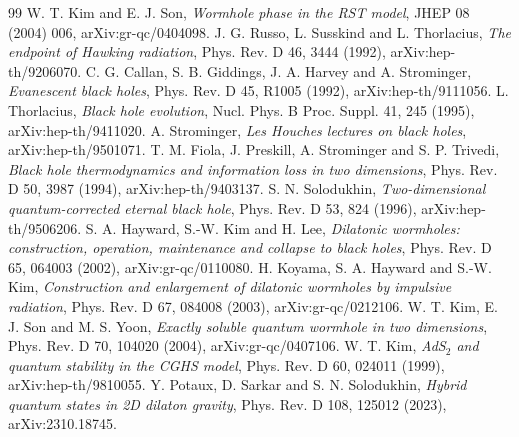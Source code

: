 \documentclass[11pt]{article}
\theoremstyle{remark}
\begin{document}
\begin{thebibliography}{99}
 W. T. Kim and E. J. Son, \emph{Wormhole phase in the RST model}, JHEP 08 (2004) 006, arXiv:gr-qc/0404098.
 J. G. Russo, L. Susskind and L. Thorlacius, \emph{The endpoint of Hawking radiation}, Phys. Rev. D 46, 3444 (1992), arXiv:hep-th/9206070.
 C. G. Callan, S. B. Giddings, J. A. Harvey and A. Strominger, \emph{Evanescent black holes}, Phys. Rev. D 45, R1005 (1992), arXiv:hep-th/9111056.
 L. Thorlacius, \emph{Black hole evolution}, Nucl. Phys. B Proc. Suppl. 41, 245 (1995), arXiv:hep-th/9411020.
 A. Strominger, \emph{Les Houches lectures on black holes}, arXiv:hep-th/9501071.
 T. M. Fiola, J. Preskill, A. Strominger and S. P. Trivedi, \emph{Black hole thermodynamics and information loss in two dimensions}, Phys. Rev. D 50, 3987 (1994), arXiv:hep-th/9403137.
 S. N. Solodukhin, \emph{Two-dimensional quantum-corrected eternal black hole}, Phys. Rev. D 53, 824 (1996), arXiv:hep-th/9506206.
 S. A. Hayward, S.-W. Kim and H. Lee, \emph{Dilatonic wormholes: construction, operation, maintenance and collapse to black holes}, Phys. Rev. D 65, 064003 (2002), arXiv:gr-qc/0110080.
 H. Koyama, S. A. Hayward and S.-W. Kim, \emph{Construction and enlargement of dilatonic wormholes by impulsive radiation}, Phys. Rev. D 67, 084008 (2003), arXiv:gr-qc/0212106.
 W. T. Kim, E. J. Son and M. S. Yoon, \emph{Exactly soluble quantum wormhole in two dimensions}, Phys. Rev. D 70, 104020 (2004), arXiv:gr-qc/0407106.
 W. T. Kim, \emph{AdS$_2$ and quantum stability in the CGHS model}, Phys. Rev. D 60, 024011 (1999), arXiv:hep-th/9810055.
 Y. Potaux, D. Sarkar and S. N. Solodukhin, \emph{Hybrid quantum states in 2D dilaton gravity}, Phys. Rev. D 108, 125012 (2023), arXiv:2310.18745.
\end{thebibliography}
\end{document}
